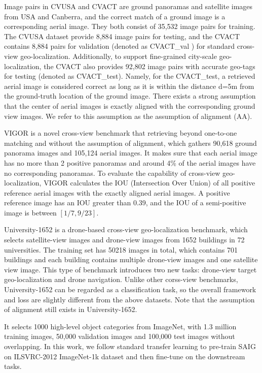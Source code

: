 \documentclass[sn-basic,iicol]{sn-jnl}
\theoremstyle{thmstyletwo}\newtheorem{example}{Example}\newtheorem{remark}{Remark}
\theoremstyle{thmstylethree}\newtheorem{definition}{Definition}
\begin{document}
 Image pairs in CVUSA and CVACT are ground panoramas and satellite images from USA and Canberra, and the correct match of a ground image is a corresponding aerial image. They both consist of 35,532 image pairs for training. The CVUSA dataset provide 8,884 image pairs for testing, and the CVACT contains 8,884 pairs for validation (denoted as CVACT\_val ) for standard cross-view geo-localization. Additionally, to support fine-grained city-scale geo-localization, the CVACT also provides 92,802 image pairs with accurate geo-tags for testing (denoted as CVACT\_test). Namely, for the CVACT\_test, a retrieved aerial image is considered correct as long as it is within the distance d=5m from the ground-truth location of the ground image.
There exists a strong assumption that the center of aerial images is exactly aligned with the corresponding ground view images. We refer to this assumption as the assumption of alignment (AA). 

 VIGOR is a novel cross-view benchmark that retrieving beyond one-to-one matching and without the assumption of alignment, which gathers 90,618 ground panorama images and 105,124 aerial images. It makes sure that each aerial image has no more than 2 positive panoramas and around 4\% of the aerial images have no corresponding panoramas. To evaluate the capability of cross-view geo-localization, VIGOR calculates the IOU (Intersection Over Union) of all positive reference aerial images with the exactly aligned aerial images. A positive reference image has an IOU greater than 0.39, and the IOU of a semi-positive image is between $ [{1}/{7},{9}/{23}]$.




 University-1652 is a drone-based cross-view geo-localization benchmark, which selects satellite-view images and drone-view images from 1652 buildings in 72 universities. The training set has 50218 images in total, which contains 701 buildings and each building contains multiple drone-view images and one satellite view image. This type of benchmark introduces two new tasks: drone-view target geo-localization and drone navigation. Unlike other corss-view benchmarks, University-1652 can be regarded as a classification task, so the overall framework and loss are slightly different from the above datasets. Note that the assumption of alignment still exists in University-1652.

 It selects 1000 high-level object categories from ImageNet, with 1.3 million training images, 50,000 validation images and 100,000 test images without overlapping. In this work, we follow standard transfer learning to pre-train SAIG on ILSVRC-2012 ImageNet-1k dataset and then fine-tune on the downstream tasks.
\end{document}
